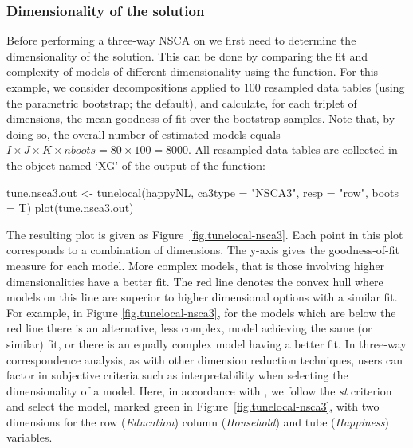 \subsubsection{Dimensionality of the solution}
\label{s:dimhappy}
Before performing a three-way NSCA on  we first need to determine the dimensionality of the solution. This can be done by comparing the fit and complexity of models of different dimensionality using the  function.  For this example, we consider decompositions applied to 100 resampled data tables (using the parametric bootstrap; the default), and calculate, for each triplet of dimensions, the mean goodness of fit over the bootstrap samples.  Note that, by doing so, the overall number of estimated models equals $I\times J\times K \times nboots = 80\times 100=8000$. All resampled data tables are collected in the object named `XG'  of the output of the  function:
\begin{example}
tune.nsca3.out <- tunelocal(happyNL, ca3type = "NSCA3", resp = "row", boots = T)
plot(tune.nsca3.out)
\end{example}

The resulting plot is given as Figure~\ref{fig.tunelocal-nsca3}. Each point in this plot corresponds to a combination of dimensions. The y-axis gives the goodness-of-fit measure for each model. More complex models, that is those involving higher dimensionalities have a better fit. The red line denotes the convex hull where models on this line are superior to higher dimensional options with a similar fit. For example, in Figure \ref{fig.tunelocal-nsca3}, for the models which are below the red line there is an alternative, less complex, model achieving the same (or similar) fit, or there is an equally complex model having a better fit. In three-way correspondence analysis, as with other dimension reduction techniques, users can factor in subjective criteria such as interpretability when selecting the dimensionality of a model. Here, in accordance with  \cite{ceukie06}, we follow the {\it st} criterion and select the model, marked green in Figure~\ref{fig.tunelocal-nsca3}, with two dimensions for the row ({\it Education}) column ({\it Household}) and tube ({\it Happiness}) variables.

